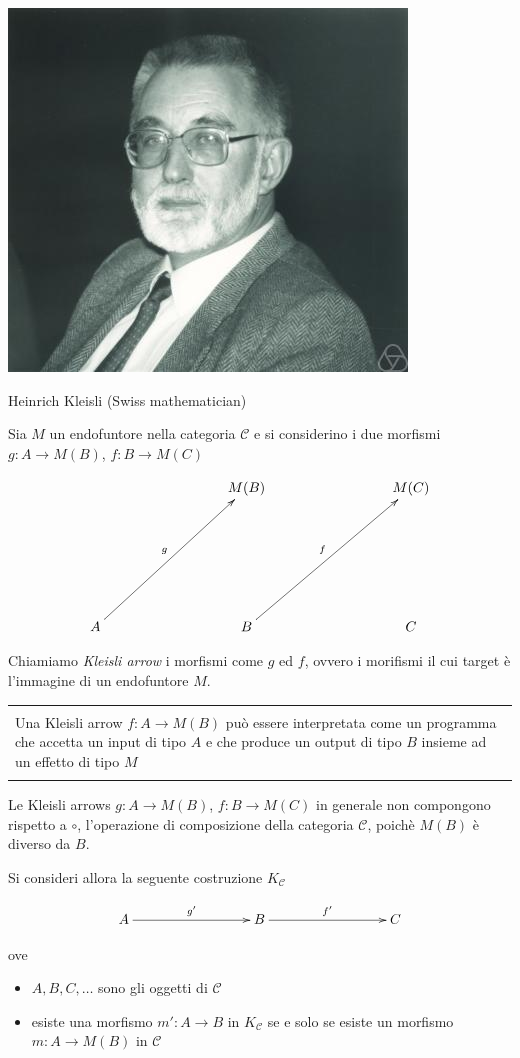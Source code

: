 \documentclass[12pt]{article}
\newenvironment{boxed}
    {\begin{center}
    \begin{tabular}{|p{0.9\textwidth}|}
    \hline\\
    }
    {
    \\\\\hline
    \end{tabular}
    \end{center}
    }
\begin{document}
\begin{center}
\includegraphics[scale=0.5]{kleisli}

Heinrich Kleisli (Swiss mathematician)
\end{center}

Sia $M$ un endofuntore nella categoria $\mathcal{C}$ e si considerino i due morfismi $g: A \rightarrow M(B)$, $f: B \rightarrow M(C)$

\[
\xymatrixrowsep{3cm}
\xymatrixcolsep{3cm}
\xymatrix{
  & M(B) & M(C) \\
  A \ar[ur]^g & B \ar[ur]^f & C
}
\]

Chiamiamo \emph{Kleisli arrow} i morfismi come $g$ ed $f$, ovvero i morifismi il cui target è l'immagine di un endofuntore $M$.

\begin{boxed}
Una Kleisli arrow $f: A \rightarrow M(B)$ può essere interpretata come un programma che accetta un input di tipo $A$ e che produce un output di tipo $B$ insieme ad un effetto di tipo $M$
\end{boxed}

Le Kleisli arrows $g: A \rightarrow M(B)$, $f: B \rightarrow M(C)$ in generale non compongono rispetto a $\circ$, l'operazione di composizione della categoria $\mathcal{C}$,
poichè $M(B)$ è diverso da $B$.

Si consideri allora la seguente costruzione $K_{\mathcal{C}}$

\[
\xymatrixrowsep{3cm}
\xymatrixcolsep{3cm}
\xymatrix{
  A \ar[r]^{g'} & B \ar[r]^{f'} & C
}
\]

ove

\begin{itemize}
  \item $A, B, C, \ldots$ sono gli oggetti di $\mathcal{C}$
  \item esiste una morfismo $m': A \rightarrow B$ in $K_{\mathcal{C}}$ se e solo se esiste un morfismo $m: A \rightarrow M(B)$ in $\mathcal{C}$
\end{itemize}
\end{document}
